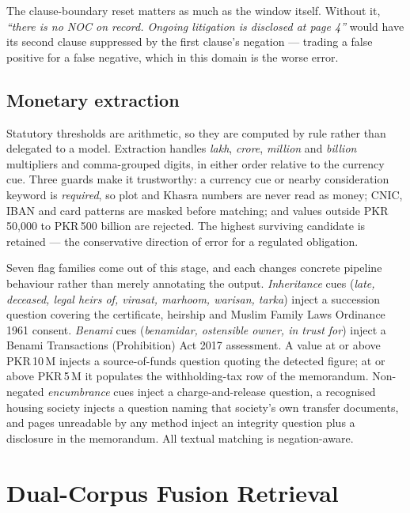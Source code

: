 \documentclass[11pt,a4paper]{article}
\newcommand{\pkr}{PKR\,}
\begin{document}
The clause-boundary reset matters as much as the window itself. Without it, \emph{``there is
no NOC on record. Ongoing litigation is disclosed at page 4''} would have its second clause
suppressed by the first clause's negation --- trading a false positive for a false negative,
which in this domain is the worse error.

\subsection{Monetary extraction}

Statutory thresholds are arithmetic, so they are computed by rule rather than delegated to a
model. Extraction handles \emph{lakh}, \emph{crore}, \emph{million} and \emph{billion}
multipliers and comma-grouped digits, in either order relative to the currency cue. Three
guards make it trustworthy: a currency cue or nearby consideration keyword is
\emph{required}, so plot and Khasra numbers are never read as money; CNIC, IBAN and card
patterns are masked before matching; and values outside \pkr 50{,}000 to \pkr 500 billion
are rejected. The highest surviving candidate is retained --- the conservative direction of
error for a regulated obligation.

Seven flag families come out of this stage, and each changes concrete pipeline behaviour
rather than merely annotating the output. \emph{Inheritance} cues (\emph{late, deceased,
legal heirs of, virasat, marhoom, warisan, tarka}) inject a succession question covering the
certificate, heirship and Muslim Family Laws Ordinance 1961 consent. \emph{Benami} cues
(\emph{benamidar, ostensible owner, in trust for}) inject a Benami Transactions
(Prohibition) Act 2017 assessment. A value at or above \pkr 10\,M injects a source-of-funds
question quoting the detected figure; at or above \pkr 5\,M it populates the
withholding-tax row of the memorandum. Non-negated \emph{encumbrance} cues inject a
charge-and-release question, a recognised housing society injects a question naming that
society's own transfer documents, and pages unreadable by any method inject an integrity
question plus a disclosure in the memorandum. All textual matching is negation-aware.

\section{Dual-Corpus Fusion Retrieval}
\label{sec:retrieval}
\end{document}
